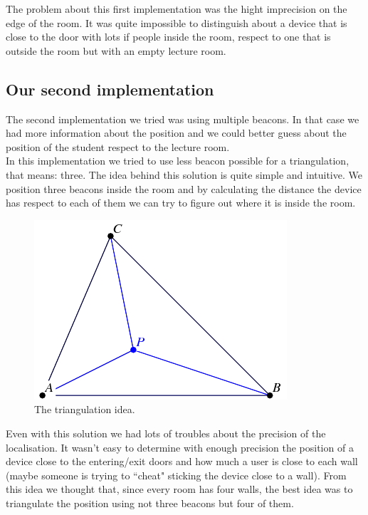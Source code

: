 The problem about this first implementation was the hight imprecision on the edge of the room. It was quite impossible to distinguish about a device that is close to the door with lots if people inside the room, respect to one that is outside the room but with an empty lecture room.\\

\subsection{Our second implementation}

The second implementation we tried was using multiple beacons. In that case we had more information about the position and we could better guess about the position of the student respect to the lecture room.\\

In this implementation we tried to use less beacon possible for a triangulation, that means: three. The idea behind this solution is quite simple and intuitive. We position three beacons inside the room and by calculating the distance the device has respect to each of them we can try to figure out where it is inside the room.\\

\begin{figure}[htbp]
\begin{center}
\includegraphics[scale=0.5]{img/triangulation.png}
\caption{The triangulation idea.}
\label{triangulation}
\end{center}
\end{figure}

Even with this solution we had lots of troubles about the precision of the localisation. It wasn't easy to determine with enough precision the position of a device close to the entering/exit doors and how much a user is close to each wall (maybe someone is trying to ``cheat" sticking the device close to a wall).
From this idea we thought that, since every room has four walls, the best idea was to triangulate the position using not three beacons but four of them.\\

